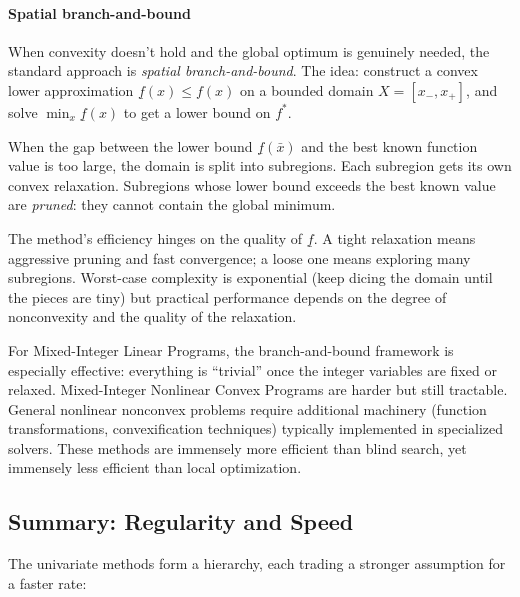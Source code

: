 \paragraph{Spatial branch-and-bound}

When convexity doesn't hold and the global optimum is genuinely needed, the standard approach is \emph{spatial branch-and-bound}.
The idea: construct a convex lower approximation $\underline{f}(x) \leq f(x)$ on a bounded domain $X = [x_-, x_+]$, and solve $\min_x \underline{f}(x)$ to get a lower bound on $f^*$.

When the gap between the lower bound $\underline{f}(\bar{x})$ and the best known function value is too large, the domain is split into subregions.
Each subregion gets its own convex relaxation.
Subregions whose lower bound exceeds the best known value are \emph{pruned}: they cannot contain the global minimum.

The method's efficiency hinges on the quality of $\underline{f}$.
A tight relaxation means aggressive pruning and fast convergence; a loose one means exploring many subregions.
Worst-case complexity is exponential (keep dicing the domain until the pieces are tiny) but practical performance depends on the degree of nonconvexity and the quality of the relaxation.

For Mixed-Integer Linear Programs, the branch-and-bound framework is especially effective: everything is ``trivial'' once the integer variables are fixed or relaxed.
Mixed-Integer Nonlinear Convex Programs are harder but still tractable.
General nonlinear nonconvex problems require additional machinery (function transformations, convexification techniques) typically implemented in specialized solvers.
These methods are immensely more efficient than blind search, yet immensely less efficient than local optimization.


\subsection{Summary: Regularity and Speed}\label{sec:univariate-summary}

The univariate methods form a hierarchy, each trading a stronger assumption for a faster rate:

